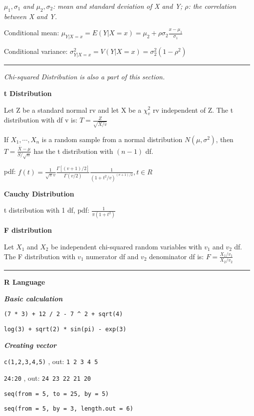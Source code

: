 \documentclass{article}
\newcommand{\sectionline}{\color{black}\rule[2pt]{0.45\textwidth}{0.05em}\color{black}}
\newcommand{\bigtitle}[1]{
	\noindent
	\textbf{#1}
}
\newcommand{\smalltitle}[1]{
	\noindent
	\textbf{\textit{#1}}
}
\newcommand{\rcode}[1]{
	\texttt{#1}
}
\begin{document}
	\textit{$\mu_1,\sigma_1$ and $\mu_2,\sigma_2$: mean and standard deviation of X and Y; $\rho$: the correlation between X and Y.}
	
	Conditional mean:
	$\mu_{Y|X=x} = E(Y|X=x) = \mu_2 + \rho\sigma_2\frac{x-\mu_1}{\sigma_1}$
	
	Conditional variance:
	$\sigma^2_{Y|X=x} = V(Y|X=x) = \sigma_2^2(1-\rho^2)$
	
	\sectionline
	
	\textit{Chi-squared Distribution is also a part of this section.}
	
	\bigtitle{t Distribution}
	
	Let Z be a standard normal rv and let X be a $\chi^2_v$ rv independent of Z. The t distribution with df v is:
	$T=\frac{Z}{\sqrt{X/v}}$
	
	
	If $X_1,\cdots , X_n$ is a random sample from a normal distribution $N(\mu,\sigma^2)$, then 
	$T = \frac{\overline{X}-\mu}{S/\sqrt{n}}$ has the t distribution with $(n-1)$ df.
	
	pdf:
	$f(t) = \frac{1}{\sqrt{\pi}v} \frac{\Gamma[(v+1)/2]}{\Gamma(v/2)}\frac{1}{(1+t^2/v)^{(v+1)/2}}, t\in R$
	
	\bigtitle{Cauchy Distribution}
	
	t distribution with 1 df, 
	pdf: $\frac{1}{\pi (1+t^2)}$
	
	
	\bigtitle{F distribution}
	
	Let $ X_1 $ and $ X_2 $ be independent chi-squared random variables with $ v_1 $ and $ v_2 $ df. The F distribution with $v_1$ numerator df and $v_2$ denominator df is:
	$F = \frac{X_1/v_1}{X_2/v_2}$
	
	
	
	
	
	\sectionline
	
	\bigtitle{R Language}
	

	
	\smalltitle{Basic calculation}
	
	\rcode{(7 * 3) + 12 / 2 - 7 ^ 2 + sqrt(4)}
	
	\rcode{log(3) + sqrt(2) * sin(pi) - exp(3)}
	
	\smalltitle{Creating vector}
	
	
	\rcode{c(1,2,3,4,5)}, out: \rcode{1 2 3 4 5}
	
	\rcode{24:20}, out: \rcode{24 23 22 21 20}
	
	\rcode{seq(from = 5, to = 25, by = 5)}
	
	\rcode{seq(from = 5, by = 3, length.out = 6)}
	
\end{document}

